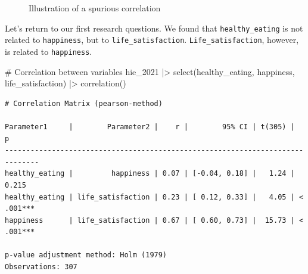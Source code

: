 \documentclass[
  letterpaper,
]{krantz}
\makeatletter
\newenvironment{Shaded}{\begin{snugshade}}{\end{snugshade}}
\newcommand{\CommentTok}[1]{\textcolor[rgb]{0.37,0.37,0.37}{#1}}
\newcommand{\FunctionTok}[1]{\textcolor[rgb]{0.28,0.35,0.67}{#1}}
\newcommand{\NormalTok}[1]{\textcolor[rgb]{0.00,0.23,0.31}{#1}}
\newcommand{\SpecialCharTok}[1]{\textcolor[rgb]{0.37,0.37,0.37}{#1}}
\newenvironment{kframe}{%
\medskip{}
\setlength{\fboxsep}{.8em}
 \def\at@end@of@kframe{}%
 \ifinner\ifhmode%
  \def\at@end@of@kframe{\end{minipage}}%
  \begin{minipage}{\columnwidth}%
 \fi\fi%
 \def\FrameCommand##1{\hskip\@totalleftmargin \hskip-\fboxsep
 \colorbox{shadecolor}{##1}\hskip-\fboxsep
     \hskip-\linewidth \hskip-\@totalleftmargin \hskip\columnwidth}%
 \MakeFramed {\advance\hsize-\width
   \@totalleftmargin\z@ \linewidth\hsize
   \@setminipage}}%
 {\par\unskip\endMakeFramed%
 \at@end@of@kframe}
\renewenvironment{Shaded}{\begin{kframe}}{\end{kframe}}
\makeatother
\begin{document}
\begin{figure}


\caption{\label{fig-illustration-spurious-correlation}Illustration of a
spurious correlation}

\end{figure}%

Let's return to our first research questions. We found that
\texttt{healthy\_eating} is not related to \texttt{happiness}, but to
\texttt{life\_satisfaction}. \texttt{Life\_satisfaction}, however, is
related to \texttt{happiness}.

\begin{Shaded}
\begin{Highlighting}[]
\CommentTok{\# Correlation between variables}
\NormalTok{hie\_2021 }\SpecialCharTok{|\textgreater{}}
  \FunctionTok{select}\NormalTok{(healthy\_eating, happiness, life\_satisfaction) }\SpecialCharTok{|\textgreater{}}
  \FunctionTok{correlation}\NormalTok{()}
\end{Highlighting}
\end{Shaded}

\begin{verbatim}
# Correlation Matrix (pearson-method)

Parameter1     |        Parameter2 |    r |        95% CI | t(305) |         p
------------------------------------------------------------------------------
healthy_eating |         happiness | 0.07 | [-0.04, 0.18] |   1.24 | 0.215    
healthy_eating | life_satisfaction | 0.23 | [ 0.12, 0.33] |   4.05 | < .001***
happiness      | life_satisfaction | 0.67 | [ 0.60, 0.73] |  15.73 | < .001***

p-value adjustment method: Holm (1979)
Observations: 307
\end{verbatim}
\end{document}

